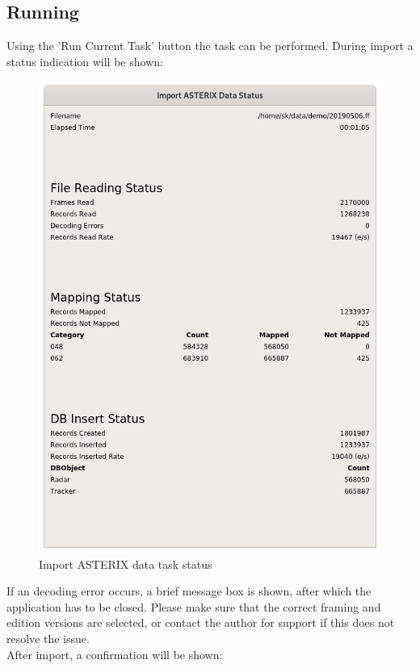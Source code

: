 \subsection{Running}

Using the 'Run Current Task' button the task can be performed. During import a status indication will be shown:

\begin{figure}[H]
  \center
    \includegraphics[width=12cm]{figures/asterix_import_status.png}
  \caption{Import ASTERIX data task status}
\end{figure}

If an decoding error occurs, a brief message box is shown, after which the application has to be closed. Please make sure that the correct framing and edition versions are selected, or contact the author for support if this does not resolve the issue. \\

After import, a confirmation will be shown:


